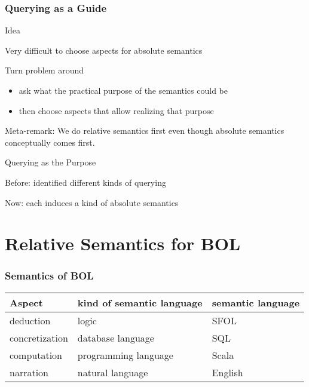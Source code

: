 \begin{frame}\frametitle{Querying as a Guide}
\begin{blockitems}{Idea}
\item Very difficult to choose aspects for absolute semantics
\item Turn problem around
 \begin{itemize}
 \item ask what the practical purpose of the semantics could be
 \item then choose aspects that allow realizing that purpose
 \end{itemize}
\end{blockitems}

Meta-remark: We do relative semantics first even though absolute semantics conceptually comes first.

\begin{blockitems}{Querying as the Purpose}
\item Before: identified different kinds of querying
\item Now: each induces a kind of absolute semantics
\end{blockitems}
\end{frame}


\section{Relative Semantics for BOL}

\begin{frame}\frametitle{Semantics of BOL}
\begin{center}
\begin{tabular}{lll}
Aspect & kind of semantic language & semantic language\\
\hline 
deduction & logic & SFOL \\
concretization & database language & SQL \\
computation & programming language & Scala \\
narration & natural language & English \\
\end{tabular}
\end{center}
\end{frame}

